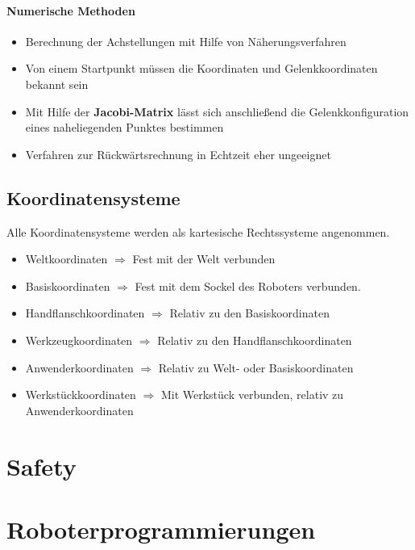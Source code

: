 \paragraph{Numerische Methoden}
\begin{itemize}
	\item Berechnung der Achstellungen mit Hilfe von Näherungsverfahren
	\item Von einem Startpunkt müssen die Koordinaten und Gelenkkoordinaten bekannt sein
	\item Mit Hilfe der \textbf{Jacobi-Matrix} lässt sich anschließend die Gelenkkonfiguration eines naheliegenden Punktes bestimmen
	\item Verfahren zur Rückwärtsrechnung in Echtzeit eher ungeeignet
\end{itemize}
\subsection{Koordinatensysteme}
Alle Koordinatensysteme werden als kartesische Rechtssysteme angenommen.
\begin{itemize}
	\item Weltkoordinaten $\Rightarrow$ Fest mit der Welt verbunden
	\item Basiskoordinaten $\Rightarrow$ Fest mit dem Sockel des Roboters verbunden.
	\item Handflanschkoordinaten $\Rightarrow$ Relativ zu den Basiskoordinaten
	\item Werkzeugkoordinaten $\Rightarrow$ Relativ zu den Handflanschkoordinaten
	\item Anwenderkoordinaten $\Rightarrow$ Relativ zu Welt- oder Basiskoordinaten
	\item Werkstückkoordinaten $\Rightarrow$ Mit Werkstück verbunden, relativ zu Anwenderkoordinaten
\end{itemize}
\section{Safety}
\section{Roboterprogrammierungen}
